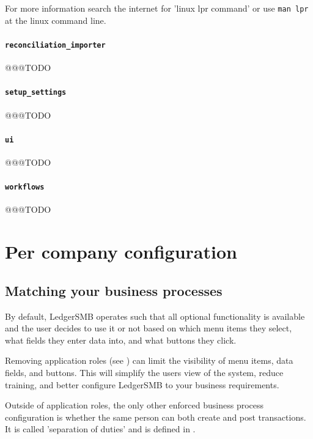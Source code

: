 For more information search the internet for 'linux lpr command' or use \texttt{man lpr} at the linux command line.

\subsubsection{\texttt{reconciliation\_importer}}
 @@@TODO

\subsubsection{\texttt{setup\_settings}}
@@@TODO

\subsubsection{\texttt{ui}}
@@@TODO

\subsubsection{\texttt{workflows}}
@@@TODO

\chapter{Per company configuration}
\label{cha-company-config}

\section{Matching your business processes}
\label{sec-company-config-matching-your-business}

By default, LedgerSMB operates such that all optional functionality is available and the user decides to use it or not based on which menu items they select, what fields they enter data into, and what buttons they click.

Removing application roles  (see ) can limit the visibility of  menu items, data fields, and buttons. This will simplify the users view of the system, reduce training, and better configure LedgerSMB to your business requirements.

Outside of application roles, the only other enforced business process configuration is whether the same person can both create and post transactions. It is called 'separation of duties'  and is defined in .

